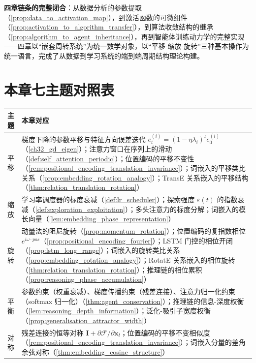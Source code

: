 \begin{remark}[与全书的统一]
\textbf{四章链条的完整闭合}：从数据分析的参数提取（\cref{prop:data_to_activation_map}），到激活函数的可微组件（\cref{prop:activation_to_algorithm_transfer}），到算法收敛结构的继承（\cref{prop:algorithm_to_agent_inheritance}），再到智能体训练动力学的完整实现——四章以“嵌套周转系统”为统一数学对象，以“平移-缩放-旋转”三种基本操作为统一语言，完成了从数据到学习系统的端到端周期结构理论构建。
\end{remark}

\section*{本章七主题对照表}

\begin{center}
\begin{tabular}{>{\centering\arraybackslash}p{2.2cm}>{\centering\arraybackslash}p{10.5cm}}
\toprule
主题 & 本章对应 \\
\midrule
平移 & 梯度下降的参数平移与特征方向误差迭代 $e_t^{(i)} = (1-\eta\lambda_i)^t e_0^{(i)}$（\cref{ch32_gd_eigen}）；注意力窗口在序列上的滑动（\cref{def:self_attention_periodic}）；位置编码的平移不变性（\cref{rem:positional_encoding_translation_invariance}）；词嵌入的平移类比关系（\cref{prop:embedding_rotation_analogy}）；TransE 关系嵌入的平移结构（\cref{thm:relation_translation_rotation}） \\
缩放 & 学习率调度器的标度衰减（\cref{def:lr_scheduler}）；探索强度 $\varepsilon(t)$ 的指数衰减（\cref{def:exploration_exploitation}）；多头注意力的标度分解；词嵌入的模长向量（\cref{lem:embedding_phase_representation}） \\
旋转 & 动量法的阻尼旋转（\cref{prop:momentum_rotation}）；位置编码的复指数相位 $e^{i\omega\cdot pos}$（\cref{prop:positional_encoding_fourier}）；LSTM 门控的相位开闭（\cref{prop:lstm_long_range}）；词嵌入的旋转类比关系（\cref{prop:embedding_rotation_analogy}）；RotatE 关系嵌入的相位旋转（\cref{thm:relation_translation_rotation}）；推理链的相位累积（\cref{prop:reasoning_phase_accumulation}） \\
平衡 & 参数约束（权重衰减）、梯度传播约束（残差连接）、注意力归一化约束（softmax 归一化）（\cref{thm:agent_conservation}）；推理链的信息-深度权衡（\cref{lem:reasoning_depth_information}）；泛化-吸引子宽度权衡（\cref{prop:generalisation_attractor_width}） \\
对称 & 残差连接的恒等对称 $\mathbf{I} + \partial\mathcal{F}/\partial\mathbf{x}_l$；位置编码的平移不变相似度（\cref{rem:positional_encoding_translation_invariance}）；词嵌入分量的差角余弦对称（\cref{thm:embedding_cosine_structure}） \\

\end{tabular}
\end{center}
